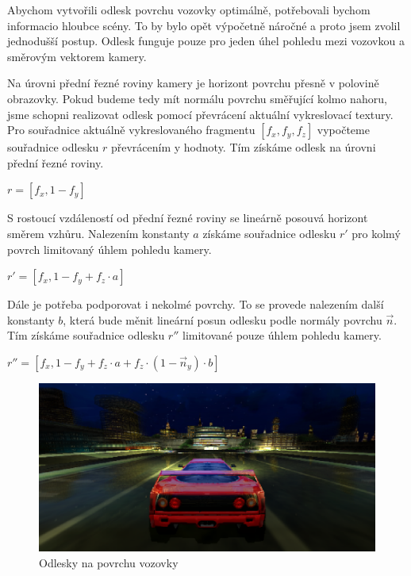 \documentclass[11pt,twoside,a4paper]{book}
\begin{document}
Abychom vytvořili odlesk povrchu vozovky optimálně, potřebovali bychom informaci\linebreak o hloubce scény. To by bylo opět výpočetně náročné a proto jsem zvolil jednodušší postup. Odlesk funguje pouze pro jeden úhel pohledu mezi vozovkou a směrovým vektorem kamery.

Na úrovni přední řezné roviny kamery je horizont povrchu přesně v polovině obrazovky. Pokud budeme tedy mít normálu povrchu směřující kolmo nahoru, jsme schopni realizovat odlesk pomocí převrácení aktuální vykreslovací textury. Pro souřadnice aktuálně vykreslovaného fragmentu $[f_x, f_y, f_z]$ vypočteme souřadnice odlesku $r$ převrácením y hodnoty. Tím získáme odlesk na úrovni  přední řezné roviny.
\begin{center}
$r = [f_x, 1 - f_y]$
\end{center}

S rostoucí vzdáleností od přední řezné roviny se lineárně posouvá horizont směrem vzhůru. Nalezením konstanty $a$ získáme souřadnice odlesku $r'$ pro kolmý povrch limitovaný úhlem pohledu kamery.
\begin{center}
$r' = [f_x, 1 - f_y + f_z \cdot a]$
\end{center}

Dále je potřeba podporovat i nekolmé povrchy. To se provede nalezením další konstanty $b$, která bude měnit lineární posun odlesku podle normály povrchu $\vec{n}$. Tím získáme souřadnice odlesku $r''$ limitované pouze úhlem pohledu kamery.
\begin{center}
$r'' = [f_x, 1 - f_y + f_z \cdot a + f_z \cdot (1 - \vec{n}_y) \cdot b]$
\end{center}

\begin{center}
\begin{figure}[h!]
\includegraphics[width=130mm]{figures/reflect-horizont.png}
\caption{Odlesky na povrchu vozovky}
\end{figure}
\end{center}
\end{document}
